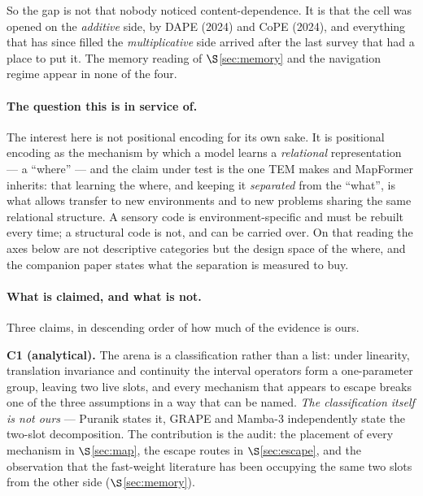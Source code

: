 \documentclass[11pt]{article}
\begin{document}
So the gap is not that nobody noticed content-dependence. It is that the cell was
opened on the \emph{additive} side, by DAPE (2024) and CoPE (2024), and everything
that has since filled the \emph{multiplicative} side arrived after the last survey
that had a place to put it. The memory reading of $\S$\ref{sec:memory} and the
navigation regime appear in none of the four.

\paragraph{The question this is in service of.} The interest here is not
positional encoding for its own sake. It is positional encoding as the mechanism by
which a model learns a \emph{relational} representation --- a ``where'' --- and the
claim under test is the one TEM makes and MapFormer inherits: that learning the
where, and keeping it \emph{separated} from the ``what'', is what allows transfer to
new environments and to new problems sharing the same relational structure. A
sensory code is environment-specific and must be rebuilt every time; a structural
code is not, and can be carried over. On that reading the axes below are not
descriptive categories but the design space of the where, and
the companion paper states what the separation is measured to buy.

\paragraph{What is claimed, and what is not.} Three claims, in descending order
of how much of the evidence is ours.

\textbf{C1 (analytical).} The arena is a classification rather than a list: under
linearity, translation invariance and continuity the interval operators form a
one-parameter group, leaving two live slots, and every mechanism that appears to
escape breaks one of the three assumptions in a way that can be named. \emph{The
classification itself is not ours} --- Puranik states it, GRAPE and Mamba-3
independently state the two-slot decomposition. The contribution is the audit: the
placement of every mechanism in $\S$\ref{sec:map}, the escape routes in
$\S$\ref{sec:escape}, and the observation that the fast-weight literature has been
occupying the same two slots from the other side ($\S$\ref{sec:memory}).
\end{document}
